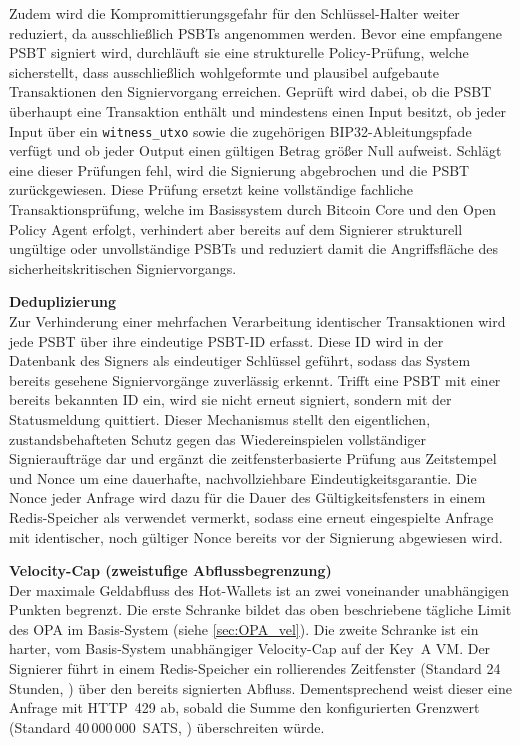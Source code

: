 Zudem wird die Kompromittierungsgefahr für den Schlüssel-Halter weiter reduziert, da ausschließlich \acp{PSBT} angenommen werden.
Bevor eine empfangene \ac{PSBT} signiert wird, durchläuft sie eine strukturelle Policy-Prüfung, welche sicherstellt, dass ausschließlich wohlgeformte und plausibel aufgebaute Transaktionen den Signiervorgang erreichen. Geprüft wird dabei, ob die \ac{PSBT} überhaupt eine Transaktion enthält und mindestens einen Input besitzt, ob jeder Input über ein \texttt{witness\_utxo} sowie die zugehörigen \ac{BIP}32-Ableitungspfade verfügt und ob jeder Output einen gültigen Betrag größer Null aufweist.
Schlägt eine dieser Prüfungen fehl, wird die Signierung abgebrochen und die \ac{PSBT} zurückgewiesen.
Diese Prüfung ersetzt keine vollständige fachliche Transaktionsprüfung, welche im Basissystem durch Bitcoin Core und den Open Policy Agent erfolgt, verhindert aber bereits auf dem Signierer strukturell ungültige oder unvollständige \acp{PSBT} und reduziert damit die Angriffsfläche des sicherheitskritischen Signiervorgangs.

\textbf{Deduplizierung} \\
Zur Verhinderung einer mehrfachen Verarbeitung identischer Transaktionen wird jede \ac{PSBT} über ihre eindeutige \ac{PSBT}-\ac{ID} erfasst. Diese \ac{ID} wird in der Datenbank des Signers als eindeutiger Schlüssel geführt, sodass das System bereits gesehene Signiervorgänge zuverlässig erkennt. Trifft eine \ac{PSBT} mit einer bereits bekannten \ac{ID} ein, wird sie nicht erneut signiert, sondern mit der Statusmeldung \texttt{} quittiert. Dieser Mechanismus stellt den eigentlichen, zustandsbehafteten Schutz gegen das Wiedereinspielen vollständiger Signieraufträge dar und ergänzt die zeitfensterbasierte Prüfung aus Zeitstempel und Nonce um eine dauerhafte, nachvollziehbare Eindeutigkeitsgarantie. Die Nonce jeder Anfrage wird dazu für die Dauer des Gültigkeitsfensters in einem Redis-Speicher als verwendet vermerkt, sodass eine erneut eingespielte Anfrage mit identischer, noch gültiger Nonce bereits vor der Signierung abgewiesen wird.

\textbf{Velocity-Cap (zweistufige Abflussbegrenzung)} \label{sec:keyA_vel} \\
Der maximale Geldabfluss des Hot-Wallets ist an zwei voneinander unabhängigen Punkten begrenzt. Die erste Schranke bildet das oben beschriebene tägliche Limit des \ac{OPA} im Basis-System (siehe \ref{sec:OPA_vel}). Die zweite Schranke ist ein harter, vom Basis-System unabhängiger Velocity-Cap auf der Key~A \ac{VM}.
Der Signierer führt in einem Redis-Speicher ein rollierendes Zeitfenster (Standard 24\,Stunden, \texttt{}) über den bereits signierten Abfluss. Dementsprechend weist dieser eine Anfrage mit \ac{HTTP}~429 ab, sobald die Summe den konfigurierten Grenzwert (Standard 40\,000\,000~\ac{SATS}, \texttt{}) überschreiten würde.

